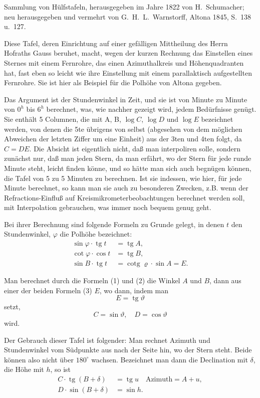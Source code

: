 \documentclass[12pt,a4paper]{article}
\theoremstyle{plain}
\theoremstyle{definition}
\theoremstyle{remark}
\DeclareMathOperator{\tg}{tg}
\DeclareMathOperator{\cotg}{cotg}
\begin{document}
Sammlung von H\"ulfstafeln, herausgegeben im Jahre 1822 von H.\ Schumacher; neu herausgegeben und vermehrt von G.\ H.\ L.\ Warnstorff, Altona 1845, S.~138 u.~127.

Diese Tafel, deren Einrichtung auf einer gef\"alligen Mittheilung des Herrn Hofraths Gauss beruhet, macht, wegen der kurzen Rechnung das Einstellen eines Sternes mit einem Fernrohre, das einen Azimuthalkreis und H\"ohenquadranten hat, fast eben so leicht wie ihre Einstellung mit einem parallaktisch aufgestellten Fernrohre. Sie ist hier als Beispiel f\"ur die Polh\"ohe von Altona gegeben.

Das Argument ist der Stundenwinkel in Zeit, und sie ist von Minute zu Minute von $0^h$ bis $6^h$ berechnet, was, wie nachher gezeigt wird, jedem Bed\"urfnisse gen\"ugt. Sie enth\"alt 5 Columnen, die mit A, B, $\log C$, $\log D$ und $\log E$ bezeichnet werden, von denen die 5te \"ubrigens von selbst (abgesehen von dem m\"oglichen Abweichen der letzten Ziffer um eine Einheit) aus der 3ten und 4ten folgt, da $C = DE$. Die Absicht ist eigentlich nicht, da\ss{} man interpoliren solle, sondern zun\"achst nur, da\ss{} man jeden Stern, da man erf\"ahrt, wo der Stern f\"ur jede runde Minute steht, leicht finden k\"onne, und so h\"atte man sich auch begn\"ugen k\"onnen, die Tafel von 5 zu 5 Minuten zu berechnen. Ist sie indessen, wie hier, f\"ur jede Minute berechnet, so kann man sie auch zu besonderen Zwecken, z.B. wenn der Refractions-Einflu\ss{} auf Kreismikrometerbeobachtungen berechnet werden soll, mit Interpolation gebrauchen, was immer noch bequem genug geht.

Bei ihrer Berechnung sind folgende Formeln zu Grunde gelegt, in denen $t$ den Stundenwinkel, $\varphi$ die Polh\"ohe bezeichnet:
\begin{align}
\sin\varphi \cdot \tg t &= \tg A, \\
\cot\varphi \cdot \cos t &= \tg B, \\
\sin B \cdot \tg t &= \cotg\varrho \cdot \sin A = E.
\end{align}

Man berechnet durch die Formeln (1) und (2) die Winkel $A$ und $B$, dann aus einer der beiden Formeln (3) $E$, wo dann, indem man
\[
E = \tg\vartheta
\]
setzt,
\[
C = \sin\vartheta, \quad D = \cos\vartheta
\]
wird.

Der Gebrauch dieser Tafel ist folgender: Man rechnet Azimuth und Stundenwinkel vom S\"udpunkte aus nach der Seite hin, wo der Stern steht. Beide k\"onnen also nicht \"uber $180^{\circ}$ wachsen. Bezeichnet man dann die Declination mit $\delta$, die H\"ohe mit $h$, so ist
\begin{align}
C \cdot \tg(B+\delta) &= \tg u \quad \text{Azimuth} = A + u, \\
D \cdot \sin(B+\delta) &= \sin h.
\end{align}
\end{document}

